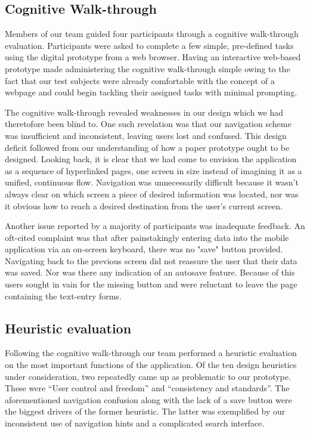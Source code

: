 \documentclass{sigchi-ext}
\begin{document}
\subsection{Cognitive Walk-through}

Members of our team guided four participants through a cognitive walk-through
evaluation. Participants were asked to complete a few simple, pre-defined tasks
using the digital prototype from a web browser. Having an interactive
web-based prototype made administering the cognitive walk-through simple owing
to the fact that our test subjects were already comfortable with the concept of
a webpage and could begin tackling their assigned tasks with minimal prompting.

The cognitive walk-through revealed weaknesses in our design which we had
theretofore been blind to. One such revelation was that our navigation scheme
was insufficient and inconsistent, leaving users lost and confused.  This
design deficit followed from our understanding of how a paper prototype ought
to be designed. Looking back, it is clear that we had come to envision the
application as a sequence of hyperlinked pages, one screen in size instead of
imagining it as a unified, continuous flow.  Navigation was unnecessarily
difficult because it wasn't always clear on which screen a piece of desired
information was located, nor was it obvious how to reach a desired destination
from the user's current screen.

Another issue reported by a majority of participants was inadequate feedback.
An oft-cited complaint was that after painstakingly entering data into the
mobile application via an on-screen keyboard, there was no "save" button
provided. Navigating back to the previous screen did not reassure the user that
their data was saved. Nor was there any indication of an autosave feature.
Because of this users sought in vain for the missing button and were reluctant
to leave the page containing the text-entry forms.



\subsection{Heuristic evaluation}

Following the cognitive walk-through our team performed a heuristic evaluation on the most important
functions of the application. Of the ten design heuristics under consideration, two repeatedly came
up as problematic to our prototype. These were ``User control and freedom'' and ``consistency and
standards''. The aforementioned navigation confusion along with the lack of a save button were the
biggest drivers of the former heuristic. The latter was exemplified by our inconsistent use of
navigation hints and a complicated search interface.
\end{document}
